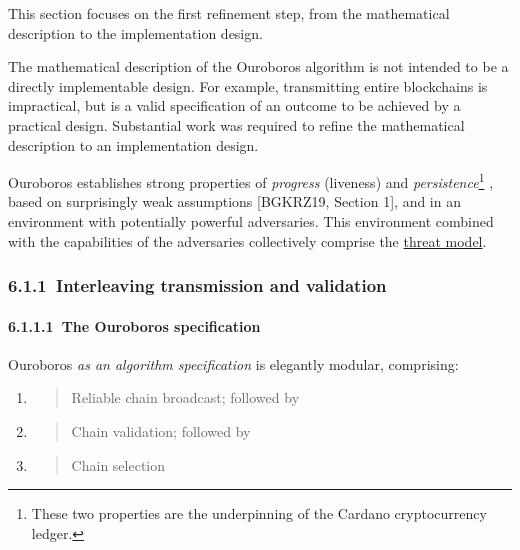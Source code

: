 \documentclass[]{article}
\let\oldparagraph\paragraph
\renewcommand{\paragraph}[1]{\oldparagraph{#1}\mbox{}}
\begin{document}
This section focuses on the first refinement step, from the mathematical
description to the implementation design.

The mathematical description of the Ouroboros algorithm is not intended
to be a directly implementable design. For example, transmitting entire
blockchains is impractical, but is a valid specification of an outcome
to be achieved by a practical design. Substantial work was required to
refine the mathematical description to an implementation design.

Ouroboros establishes strong properties of \emph{progress} (liveness)
and \emph{persistence}\footnote{These two properties are the
  underpinning of the Cardano cryptocurrency ledger.} , based on
surprisingly weak assumptions {[}BGKRZ19, Section 1{]}, and in an
environment with potentially powerful adversaries. This environment
combined with the capabilities of the adversaries collectively comprise
the \protect\hyperlink{high-level-threat-model}{{threat model}}.

\hypertarget{interleaving-transmission-and-validation}{%
\subsubsection{​6.1.1​~Interleaving transmission and
validation}\label{interleaving-transmission-and-validation}}

\hypertarget{the-ouroboros-specification}{%
\paragraph{​6.1.1.1​~The Ouroboros
specification}\label{the-ouroboros-specification}}

Ouroboros \emph{as an algorithm specification} is elegantly modular,
comprising:

\begin{enumerate}
\def\labelenumi{\arabic{enumi}.}
\item
  \begin{quote}
  Reliable chain broadcast; followed by
  \end{quote}
\item
  \begin{quote}
  Chain validation; followed by
  \end{quote}
\item
  \begin{quote}
  Chain selection
  \end{quote}
\end{enumerate}
\end{document}
